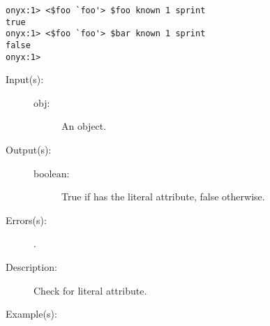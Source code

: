 \begin{description}
\begin{description}
\begin{verbatim}
onyx:1> <$foo `foo'> $foo known 1 sprint
true
onyx:1> <$foo `foo'> $bar known 1 sprint
false
onyx:1>
		\end{verbatim}
	\end{description}
\label{systemdict:lcheck}
\item[{\onyxop{obj}{lcheck}{boolean}}: ]
	\begin{description}\item[]
	\item[Input(s): ]
		\begin{description}\item[]
		\item[obj: ]
			An object.
		\end{description}
	\item[Output(s): ]
		\begin{description}\item[]
		\item[boolean: ]
			True if  has the literal attribute, false
			otherwise.
		\end{description}
	\item[Errors(s): ]
		\begin{description}\item[]
		\item[.]
		\end{description}
	\item[Description: ]
		Check  for literal attribute.
	\item[Example(s): ]\begin{verbatim}


\end{verbatim}
\end{description}
\end{description}
